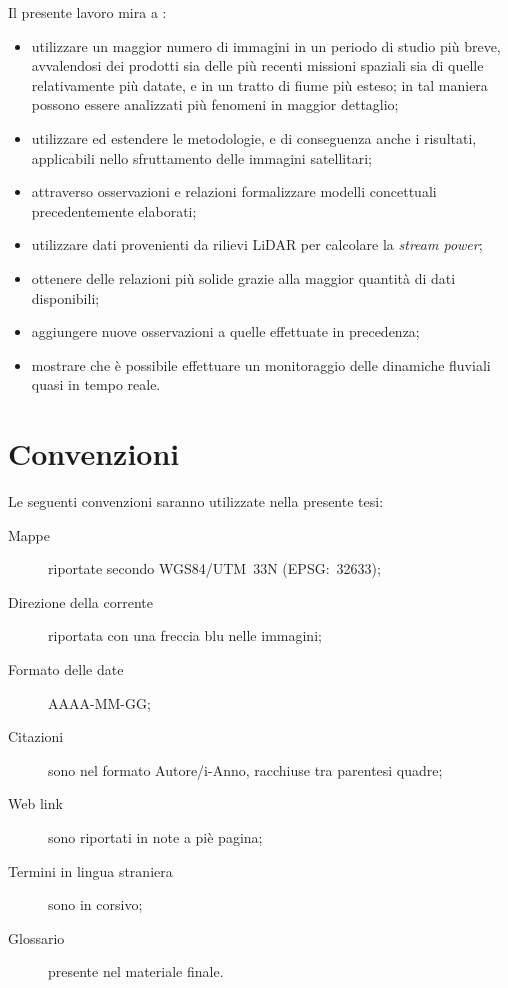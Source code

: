 Il presente lavoro mira a :
\begin{itemize}
	\item utilizzare un maggior numero di immagini in un periodo di studio più breve, avvalendosi dei prodotti sia delle più recenti missioni spaziali sia di quelle relativamente più datate, e in un tratto di fiume più esteso; in tal maniera possono essere analizzati più fenomeni in maggior dettaglio;
	\item utilizzare ed estendere le metodologie, e di conseguenza anche i risultati, applicabili nello sfruttamento delle immagini satellitari;
	\item attraverso osservazioni e relazioni formalizzare modelli concettuali precedentemente elaborati;
	\item utilizzare dati provenienti da rilievi LiDAR per calcolare la \emph{stream power};
	\item ottenere delle relazioni più solide grazie alla maggior quantità di dati disponibili;
	\item aggiungere nuove osservazioni a quelle effettuate in precedenza;
	\item mostrare che è possibile effettuare un monitoraggio delle dinamiche fluviali quasi in tempo reale. 
\end{itemize}



\section{Convenzioni}
Le seguenti convenzioni saranno utilizzate nella presente tesi:
\begin{description}
	\item[Mappe] riportate secondo WGS84/UTM~33N (EPSG:~32633);
	\item[Direzione della corrente] riportata con una freccia blu nelle immagini;
	\item[Formato delle date] AAAA-MM-GG;
	\item[Citazioni] sono nel formato Autore/i-Anno, racchiuse tra parentesi quadre;
	\item[Web link] sono riportati in note a piè pagina;
	\item[Termini in lingua straniera] sono in corsivo;
	\item[Glossario] presente nel materiale finale.
\end{description}




